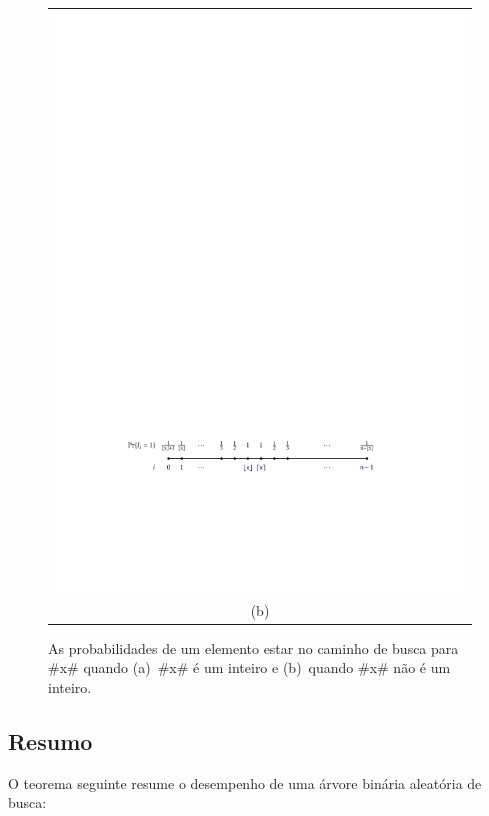 \begin{figure}
\begin{center}
\begin{tabular}{@{}c@{}}
      \includegraphics[width=\ScaleIfNeeded]{figs/rbst-probs-b} \\ (b) \\[2ex]
    \end{tabular}
  \end{center}
  \caption[As probabilidades de um elemento estar em um caminho de busca]{As probabilidades de um elemento estar no caminho de busca para #x#
   quando (a)~#x# é um inteiro e (b)~quando #x# não é um inteiro.}
\end{figure}

\subsection{Resumo}

O teorema seguinte resume o desempenho de uma árvore binária aleatória de busca:

